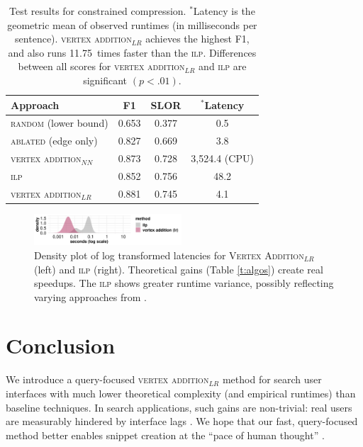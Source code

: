 \documentclass[11pt,a4paper]{article}
\newcommand{\exact}[0]{11.75~}
\begin{document}
{\begin{table}[]
\begin{tabular}{lccc}
\centering
Approach & F1 & SLOR & $^{*}$Latency \\ \hline
\textsc{random} {\small (lower bound) }&{\small 0.653}&{\small 0.377}& {\small 0.5} \\
\textsc{ablated} {\small (edge only) }&{\small 0.827}&{\small 0.669}&{\small 3.8}\\
\textsc{vertex addition}$_{NN}$& {\small 0.873}& {\small 0.728}& {\small 3,524.4} {\tiny  (CPU)} \\ \midrule 
\textsc{ilp}&{\small 0.852}& {\small 0.756}&{\small 48.2}\\
\textsc{vertex addition}$_{LR}$ & \small 0.881 & {\small 0.745}& \small 4.1 \\
\end{tabular}
\caption{Test results for constrained compression. $^*$Latency is the geometric mean of observed runtimes (in milliseconds per sentence). \textsc{vertex addition}$_{LR}$ achieves the highest F1, and also runs \exact times faster than the \textsc{ilp}. Differences between all scores for \textsc{vertex addition}$_{LR}$ and \textsc{ilp} are significant {\tiny $(p < .01)$}.}
\label{t:results}
\end{table}

\begin{figure}[htb!]
\centering
\includegraphics[width=5.5cm]{times.pdf}
\caption{Density plot of log transformed latencies for \textsc{Vertex Addition}$_{LR}$ (left) and \textsc{ilp} (right). Theoretical gains (Table \ref{t:algos}) create real speedups. The \textsc{ilp} shows greater runtime variance, possibly reflecting varying approaches from \citet{gurobi}.}
\label{t:times}
\end{figure}

\section{Conclusion}

We introduce a query-focused \textsc{vertex addition}$_{LR}$ method for search user interfaces with much lower theoretical complexity (and empirical runtimes) than baseline techniques. In search applications, such gains are non-trivial: real users are measurably hindered by interface lags \cite{Nielsen,Liu2014TheEO}. We hope that our fast, query-focused method better enables snippet creation at the ``pace of human thought'' \cite{heerschei}.


}
\end{document}

